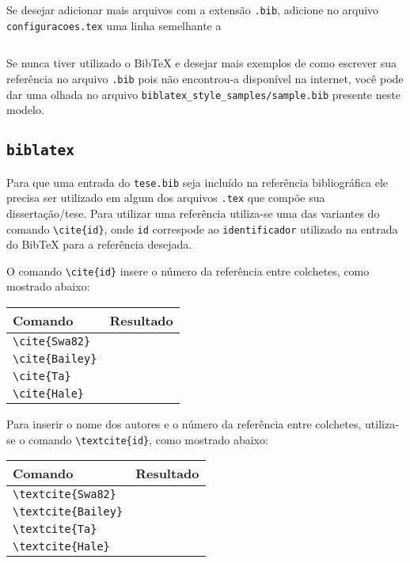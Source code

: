 Se desejar adicionar mais arquivos com a extensão \lstinline+.bib+, adicione no
arquivo \lstinline+configuracoes.tex+ uma linha semelhante a
\begin{lstlisting}

\end{lstlisting}

Se nunca tiver utilizado o BibTeX e desejar mais exemplos de como escrever sua
referência no arquivo \lstinline+.bib+ pois não encontrou-a disponível na
internet, você pode dar uma olhada no arquivo
\lstinline+biblatex_style_samples/sample.bib+ presente neste modelo.

\subsection{\lstinline+biblatex+}
Para que uma entrada do \lstinline+tese.bib+ seja incluído na referência
bibliográfica ele precisa ser utilizado em algum dos arquivos \lstinline+.tex+
que compõe sua dissertação/tese. Para utilizar uma referência utiliza-se uma das
variantes do comando \lstinline+\cite{id}+, onde
\lstinline+id+ correspode ao \lstinline+identificador+ utilizado na entrada do
BibTeX para a referência desejada.

O comando \lstinline+\cite{id}+ insere o número da referência entre colchetes,
como mostrado abaixo:
\begin{table}[!h]
  \centering
  \begin{tabular}{lc}
    \toprule
    Comando & Resultado \\ \midrule
    \lstinline+\cite{Swa82}+ & \cite{Swa82} \\
    \lstinline+\cite{Bailey}+ & \cite{Bailey} \\
    \lstinline+\cite{Ta}+ & \cite{Ta} \\
    \lstinline+\cite{Hale}+ & \cite{Hale} \\ \bottomrule
  \end{tabular}
\end{table}

Para inserir o nome dos autores e o número da referência entre colchetes,
utiliza-se o comando \lstinline+\textcite{id}+, como mostrado abaixo:
\begin{table}[!h]
  \centering
  \begin{tabular}{ll}
    \toprule
    Comando & Resultado \\ \midrule
    \lstinline+\textcite{Swa82}+ & \textcite{Swa82} \\
    \lstinline+\textcite{Bailey}+ & \textcite{Bailey} \\
    \lstinline+\textcite{Ta}+ & \textcite{Ta} \\
    \lstinline+\textcite{Hale}+ & \textcite{Hale} \\ \bottomrule
  \end{tabular}
\end{table}

